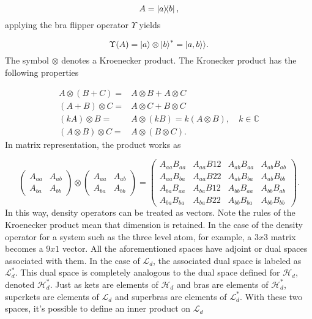 \documentclass[12pt]{article}
\newcommand{\superket}[1]{|#1\rangle\rangle}
\begin{document}
\begin{equation}
    A = \ketbra{a}{b},
\end{equation} applying the bra flipper operator $\Upsilon$ yields

\begin{equation}
    \Upsilon(A) = \ket{a} \otimes \ket{b}^* =\superket{a,b}.
\end{equation} The symbol $\otimes$ denotes a Kroenecker product. The Kronecker product has the following properties \cite{FernandezKronecker2016}

\begin{align*}
    A \otimes (B+C) =& A \otimes B + A \otimes C\\
    (A+B) \otimes C =& A \otimes C + B \otimes C\\
    (kA)\otimes B =& A\otimes (kB) = k(A \otimes B), \quad k \in \mathbb{C}\\
    (A \otimes B) \otimes C =& A \otimes (B \otimes C).
\end{align*} In matrix representation, the product works as

\begin{equation}
\begin{pmatrix}
A_{aa} & A_{ab} \\
A_{ba} & A_{bb}
\end{pmatrix}
\otimes
\begin{pmatrix}
A_{aa} & A_{ab} \\
A_{ba} & A_{bb}
\end{pmatrix} =
\begin{pmatrix}
A_{aa} B_{aa} & A_{aa} B{12} & A_{ab} B_{aa} & A_{ab} B_{ab} \\
A_{aa} B_{ba} & A_{aa} B{22} & A_{ab} B_{ba} & A_{ab} B_{bb} \\
A_{ba} B_{aa} & A_{ba} B{12} & A_{bb} B_{aa} & A_{bb} B_{ab} \\
A_{ba} B_{ba} & A_{ba} B{22} & A_{bb} B_{ba} & A_{bb} B_{bb}
\end{pmatrix}.
\end{equation}
In this way, density operators can be treated as vectors. Note the rules of the Kroenecker product mean that dimension is retained. In the case of the density operator for a system such as the three level atom, for example, a $3x3$ matrix becomes a $9x1$ vector. All the aforementioned spaces have adjoint or dual spaces associated with them. In the case of $\mathcal{L}_d$, the associated dual space is labeled as $\mathcal{L}^*_d$. This dual space is completely analogous to the dual space defined for $\mathcal{H}_d$, denoted $\mathcal{H}^*_d$. Just as kets are elements of $\mathcal{H}_d$ and bras are elements of  $\mathcal{H}^*_d$, superkets are elements of $\mathcal{L}_d$ and superbras are elements of $\mathcal{L}^*_d$. With these two spaces, it's possible to define an inner product on $\mathcal{L}_d$
\end{document}
